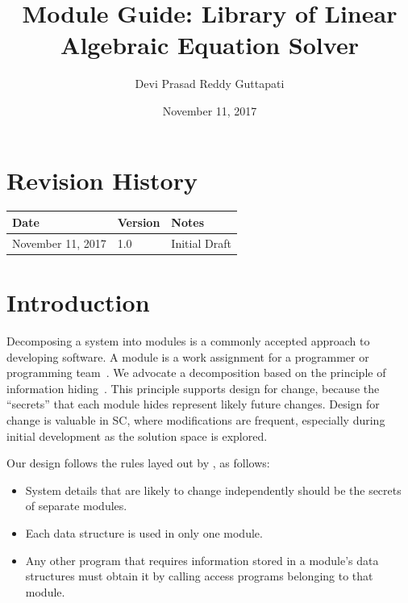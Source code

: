 \documentclass[12pt, titlepage]{article}
\begin{document}
\title{Module Guide: Library of Linear Algebraic Equation Solver} 
\author{Devi Prasad Reddy Guttapati}
\date{November 11, 2017}

\maketitle


\section{Revision History}

\begin{tabularx}{\textwidth}{p{3cm}p{2cm}X}
\toprule {\bf Date} & {\bf Version} & {\bf Notes}\\
\midrule
November 11, 2017 & 1.0 & Initial Draft\\

\bottomrule
\end{tabularx}

\newpage

\tableofcontents

\listoftables

\listoffigures

\newpage


\section{Introduction}

Decomposing a system into modules is a commonly accepted approach to developing
software.  A module is a work assignment for a programmer or programming
team~\citep{ParnasEtAl1984}.  We advocate a decomposition
based on the principle of information hiding~\citep{Parnas1972a}.  This
principle supports design for change, because the ``secrets'' that each module
hides represent likely future changes.  Design for change is valuable in SC,
where modifications are frequent, especially during initial development as the
solution space is explored.  

Our design follows the rules layed out by \citet{ParnasEtAl1984}, as follows:
\begin{itemize}
\item System details that are likely to change independently should be the
  secrets of separate modules.
\item Each data structure is used in only one module.
\item Any other program that requires information stored in a module's data
  structures must obtain it by calling access programs belonging to that module.
\end{itemize}
\end{document}
